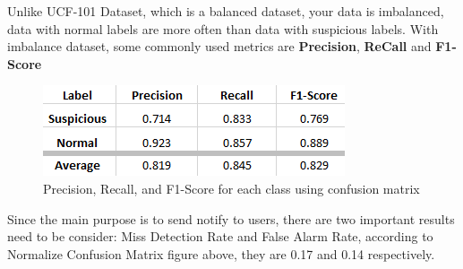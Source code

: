 Unlike UCF-101 Dataset, which is a balanced dataset, your data is imbalanced, data with normal labels are more often than data with suspicious labels. With imbalance dataset, some commonly used metrics are \textbf{Precision}, \textbf{ReCall} and \textbf{F1-Score}
\begin{figure}[H]
	\centering
	\includegraphics[width=0.7\columnwidth]{images/chap5/evaluate.png}
	\caption{Precision, Recall, and F1-Score for each class using confusion matrix}
\end{figure}
Since the main purpose is to send notify to users, there are two important results need to be consider: Miss Detection Rate and False Alarm Rate, according to Normalize Confusion Matrix figure above, they are 0.17 and 0.14 respectively.

